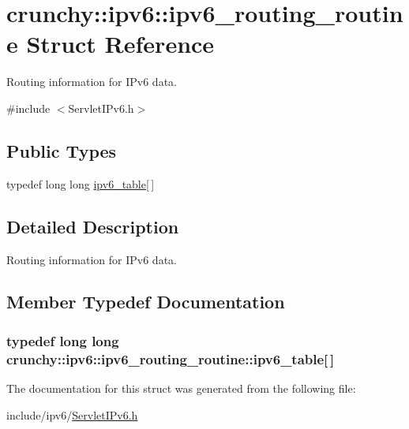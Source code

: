 \hypertarget{structcrunchy_1_1ipv6_1_1ipv6__routing__routine}{}\section{crunchy\+:\+:ipv6\+:\+:ipv6\+\_\+routing\+\_\+routine Struct Reference}
\label{structcrunchy_1_1ipv6_1_1ipv6__routing__routine}


Routing information for I\+Pv6 data.  




{\ttfamily \#include $<$Servlet\+I\+Pv6.\+h$>$}

\subsection*{Public Types}
\begin{DoxyCompactItemize}
\item 
typedef long long \hyperlink{structcrunchy_1_1ipv6_1_1ipv6__routing__routine_af4e670bc736a9954d92ec3adf0c1434c}{ipv6\+\_\+table}\mbox{[}$\,$\mbox{]}
\end{DoxyCompactItemize}


\subsection{Detailed Description}
Routing information for I\+Pv6 data. 

\subsection{Member Typedef Documentation}
\hypertarget{structcrunchy_1_1ipv6_1_1ipv6__routing__routine_af4e670bc736a9954d92ec3adf0c1434c}{}
\subsubsection[{ipv6\+\_\+table}]{\setlength{\rightskip}{0pt plus 5cm}typedef long long crunchy\+::ipv6\+::ipv6\+\_\+routing\+\_\+routine\+::ipv6\+\_\+table\mbox{[}$\,$\mbox{]}}\label{structcrunchy_1_1ipv6_1_1ipv6__routing__routine_af4e670bc736a9954d92ec3adf0c1434c}


The documentation for this struct was generated from the following file\+:\begin{DoxyCompactItemize}
\item 
include/ipv6/\hyperlink{_servlet_i_pv6_8h}{Servlet\+I\+Pv6.\+h}\end{DoxyCompactItemize}
